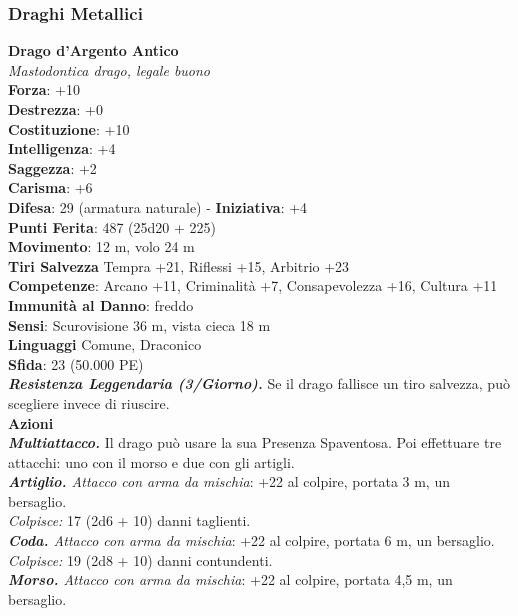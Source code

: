 \begin{multicols}{2}
\subsubsection{Draghi Metallici}

\medskip\textbf{Drago d'Argento Antico}\\
\emph{Mastodontica drago, legale buono}\\
\textbf{Forza}: +10\\
\textbf{Destrezza}: +0\\
\textbf{Costituzione}: +10\\
\textbf{Intelligenza}: +4\\
\textbf{Saggezza}: +2\\
\textbf{Carisma}: +6\\
\textbf{Difesa}: 29 (armatura naturale) - \textbf{Iniziativa}: +4\\
\textbf{Punti Ferita}: 487 (25d20 + 225) \\
\textbf{Movimento}: 12 m, volo 24 m\\
\textbf{Tiri Salvezza} Tempra +21, Riflessi +15, Arbitrio +23\\
\textbf{Competenze}: Arcano +11, Criminalità +7, Consapevolezza +16, Cultura +11\\
\textbf{Immunità al Danno}: freddo\\
\textbf{Sensi}: Scurovisione 36 m, vista cieca 18 m\\
\textbf{Linguaggi} Comune, Draconico\\
\textbf{Sfida}: 23 (50.000 PE)\smallskip\\
\emph{\textbf{Resistenza Leggendaria (3/Giorno).}} Se il drago fallisce un tiro salvezza, può scegliere invece di riuscire.\\
\smallskip\textbf{Azioni} \\
\emph{\textbf{Multiattacco.}} Il drago può usare la sua Presenza Spaventosa. Poi effettuare tre attacchi: uno con il morso e due con gli artigli.\\
\emph{\textbf{Artiglio.} Attacco con arma da mischia}: +22 al colpire, portata 3 m, un bersaglio.\\
\emph{Colpisce:} 17 (2d6 + 10) danni taglienti.\\
\emph{\textbf{Coda.} Attacco con arma da mischia}: +22 al colpire, portata 6 m, un bersaglio.\\
\emph{Colpisce:} 19 (2d8 + 10) danni contundenti. \\
\emph{\textbf{Morso.} Attacco con arma da mischia}: +22 al colpire, portata 4,5 m, un bersaglio.\\

\end{multicols}
